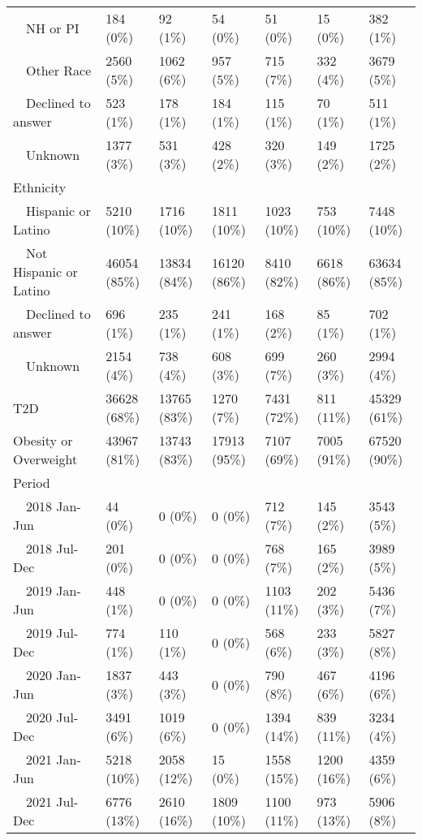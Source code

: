 \begin{longtable}{p{}p{}p{}p{}p{}p{}p{}}
    NH or PI & 184 (0\%) & 92 (1\%) & 54 (0\%) & 51 (0\%) & 15 (0\%) & 382 (1\%) \\ 
    Other Race & 2560 (5\%) & 1062 (6\%) & 957 (5\%) & 715 (7\%) & 332 (4\%) & 3679 (5\%) \\ 
    Declined to answer & 523 (1\%) & 178 (1\%) & 184 (1\%) & 115 (1\%) & 70 (1\%) & 511 (1\%) \\ 
    Unknown & 1377 (3\%) & 531 (3\%) & 428 (2\%) & 320 (3\%) & 149 (2\%) & 1725 (2\%) \\ 
  Ethnicity &  &  &  &  &  &  \\ 
    Hispanic or Latino & 5210 (10\%) & 1716 (10\%) & 1811 (10\%) & 1023 (10\%) & 753 (10\%) & 7448 (10\%) \\ 
    Not Hispanic or Latino & 46054 (85\%) & 13834 (84\%) & 16120 (86\%) & 8410 (82\%) & 6618 (86\%) & 63634 (85\%) \\ 
    Declined to answer & 696 (1\%) & 235 (1\%) & 241 (1\%) & 168 (2\%) & 85 (1\%) & 702 (1\%) \\ 
    Unknown & 2154 (4\%) & 738 (4\%) & 608 (3\%) & 699 (7\%) & 260 (3\%) & 2994 (4\%) \\ 
  T2D & 36628 (68\%) & 13765 (83\%) & 1270 (7\%) & 7431 (72\%) & 811 (11\%) & 45329 (61\%) \\ 
  Obesity or Overweight & 43967 (81\%) & 13743 (83\%) & 17913 (95\%) & 7107 (69\%) & 7005 (91\%) & 67520 (90\%) \\ 
  Period &  &  &  &  &  &  \\ 
    2018 Jan-Jun & 44 (0\%) & 0 (0\%) & 0 (0\%) & 712 (7\%) & 145 (2\%) & 3543 (5\%) \\ 
    2018 Jul-Dec & 201 (0\%) & 0 (0\%) & 0 (0\%) & 768 (7\%) & 165 (2\%) & 3989 (5\%) \\ 
    2019 Jan-Jun & 448 (1\%) & 0 (0\%) & 0 (0\%) & 1103 (11\%) & 202 (3\%) & 5436 (7\%) \\ 
    2019 Jul-Dec & 774 (1\%) & 110 (1\%) & 0 (0\%) & 568 (6\%) & 233 (3\%) & 5827 (8\%) \\ 
    2020 Jan-Jun & 1837 (3\%) & 443 (3\%) & 0 (0\%) & 790 (8\%) & 467 (6\%) & 4196 (6\%) \\ 
    2020 Jul-Dec & 3491 (6\%) & 1019 (6\%) & 0 (0\%) & 1394 (14\%) & 839 (11\%) & 3234 (4\%) \\ 
    2021 Jan-Jun & 5218 (10\%) & 2058 (12\%) & 15 (0\%) & 1558 (15\%) & 1200 (16\%) & 4359 (6\%) \\ 
    2021 Jul-Dec & 6776 (13\%) & 2610 (16\%) & 1809 (10\%) & 1100 (11\%) & 973 (13\%) & 5906 (8\%) \\ 

\end{longtable}
